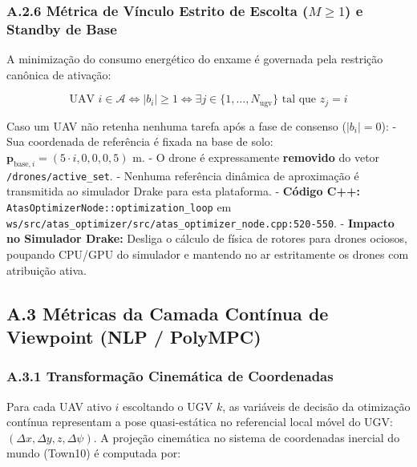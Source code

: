 \documentclass[
  brazilian,
  a4paper]{article}
\begin{document}
\subsubsection{\texorpdfstring{A.2.6 Métrica de Vínculo Estrito de
Escolta (\(M \ge 1\)) e Standby de
Base}{A.2.6 Métrica de Vínculo Estrito de Escolta (M \textbackslash ge 1) e Standby de Base}}\label{a.2.6-muxe9trica-de-vuxednculo-estrito-de-escolta-m-ge-1-e-standby-de-base}

A minimização do consumo energético do enxame é governada pela restrição
canônica de ativação:

\[\text{UAV } i \in \mathcal{A} \iff |b_i| \ge 1 \iff \exists j \in \{1, \dots, N_{\text{ugv}}\} \text{ tal que } z_j = i\]

Caso um UAV não retenha nenhuma tarefa após a fase de consenso
(\(|b_i| = 0\)): - Sua coordenada de referência é fixada na base de
solo:
\(\mathbf{p}_{\text{base}, i} = (5 \cdot i, 0{,}0, 0{,}5)\text{ m}\). -
O drone é expressamente \textbf{removido} do vetor
\texttt{/\allowbreak{}drones/\allowbreak{}active\_\allowbreak{}set}. - Nenhuma referência dinâmica de
aproximação é transmitida ao simulador Drake para esta plataforma. -
\textbf{Código C++:} \texttt{AtasOptimizerNode:\allowbreak{}:\allowbreak{}optimization\_\allowbreak{}loop} em
\texttt{ws/\allowbreak{}src/\allowbreak{}atas\_\allowbreak{}optimizer/\allowbreak{}src/\allowbreak{}atas\_\allowbreak{}optimizer\_\allowbreak{}node.\allowbreak{}cpp:\allowbreak{}520-550}. -
\textbf{Impacto no Simulador Drake:} Desliga o cálculo de física de
rotores para drones ociosos, poupando CPU/GPU do simulador e mantendo no
ar estritamente os drones com atribuição ativa.

\subsection{A.3 Métricas da Camada Contínua de Viewpoint (NLP /
PolyMPC)}\label{a.3-muxe9tricas-da-camada-contuxednua-de-viewpoint-nlp-polympc}

\subsubsection{A.3.1 Transformação Cinemática de
Coordenadas}\label{a.3.1-transformauxe7uxe3o-cinemuxe1tica-de-coordenadas}

Para cada UAV ativo \(i\) escoltando o UGV \(k\), as variáveis de
decisão da otimização contínua representam a pose quasi-estática no
referencial local móvel do UGV:
\((\Delta x, \Delta y, z, \Delta \psi)\). A projeção cinemática no
sistema de coordenadas inercial do mundo (Town10) é computada por:
\end{document}
